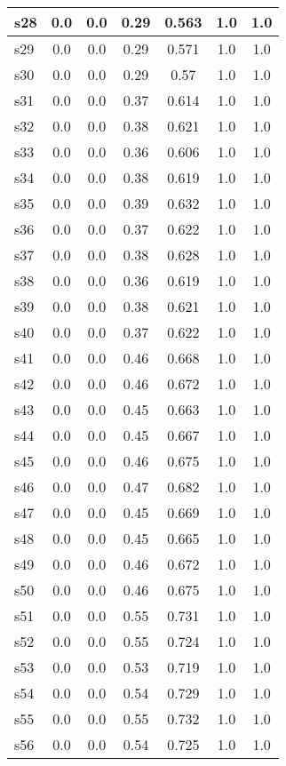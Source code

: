 \documentclass{article}
\begin{document}
\begin{tabular}{|l|c|c|c|c|c|c|}
\hline
s28 &0.0 & 0.0 & 0.29 & 0.563 & 1.0 & 1.0\\
\hline
s29 &0.0 & 0.0 & 0.29 & 0.571 & 1.0 & 1.0\\
\hline
s30 &0.0 & 0.0 & 0.29 & 0.57 & 1.0 & 1.0\\
\hline
s31 &0.0 & 0.0 & 0.37 & 0.614 & 1.0 & 1.0\\
\hline
s32 &0.0 & 0.0 & 0.38 & 0.621 & 1.0 & 1.0\\
\hline
s33 &0.0 & 0.0 & 0.36 & 0.606 & 1.0 & 1.0\\
\hline
s34 &0.0 & 0.0 & 0.38 & 0.619 & 1.0 & 1.0\\
\hline
s35 &0.0 & 0.0 & 0.39 & 0.632 & 1.0 & 1.0\\
\hline
s36 &0.0 & 0.0 & 0.37 & 0.622 & 1.0 & 1.0\\
\hline
s37 &0.0 & 0.0 & 0.38 & 0.628 & 1.0 & 1.0\\
\hline
s38 &0.0 & 0.0 & 0.36 & 0.619 & 1.0 & 1.0\\
\hline
s39 &0.0 & 0.0 & 0.38 & 0.621 & 1.0 & 1.0\\
\hline
s40 &0.0 & 0.0 & 0.37 & 0.622 & 1.0 & 1.0\\
\hline
s41 &0.0 & 0.0 & 0.46 & 0.668 & 1.0 & 1.0\\
\hline
s42 &0.0 & 0.0 & 0.46 & 0.672 & 1.0 & 1.0\\
\hline
s43 &0.0 & 0.0 & 0.45 & 0.663 & 1.0 & 1.0\\
\hline
s44 &0.0 & 0.0 & 0.45 & 0.667 & 1.0 & 1.0\\
\hline
s45 &0.0 & 0.0 & 0.46 & 0.675 & 1.0 & 1.0\\
\hline
s46 &0.0 & 0.0 & 0.47 & 0.682 & 1.0 & 1.0\\
\hline
s47 &0.0 & 0.0 & 0.45 & 0.669 & 1.0 & 1.0\\
\hline
s48 &0.0 & 0.0 & 0.45 & 0.665 & 1.0 & 1.0\\
\hline
s49 &0.0 & 0.0 & 0.46 & 0.672 & 1.0 & 1.0\\
\hline
s50 &0.0 & 0.0 & 0.46 & 0.675 & 1.0 & 1.0\\
\hline
s51 &0.0 & 0.0 & 0.55 & 0.731 & 1.0 & 1.0\\
\hline
s52 &0.0 & 0.0 & 0.55 & 0.724 & 1.0 & 1.0\\
\hline
s53 &0.0 & 0.0 & 0.53 & 0.719 & 1.0 & 1.0\\
\hline
s54 &0.0 & 0.0 & 0.54 & 0.729 & 1.0 & 1.0\\
\hline
s55 &0.0 & 0.0 & 0.55 & 0.732 & 1.0 & 1.0\\
\hline
s56 &0.0 & 0.0 & 0.54 & 0.725 & 1.0 & 1.0\\

\end{tabular}
\end{document}
